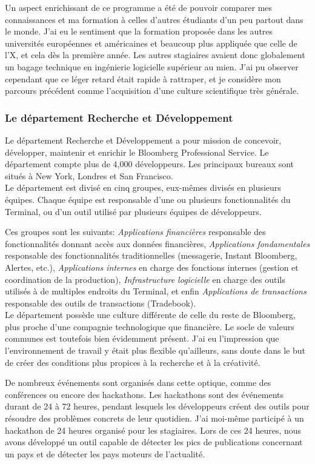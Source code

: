 \documentclass[11pt, oneside, titlepage, a4paper]{article}
\begin{document}
Un aspect enrichissant de ce programme a été de pouvoir comparer mes connaissances et ma formation à celles d'autres étudiants d'un peu partout dans le monde. J'ai eu le sentiment que la formation proposée dans les autres universités européennes et américaines et beaucoup plus \og appliquée \fg{} que celle de l'X, et cela dès la première année. Les autres stagiaires avaient donc globalement un bagage technique en ingénierie logicielle supérieur au mien. J'ai pu observer cependant que ce léger retard était rapide à rattraper, et je considère mon parcours précédent comme l'acquisition d'une culture scientifique très générale.
		\subsubsection{Le département Recherche et Développement} \label{RD}
Le département Recherche et Développement a pour mission de concevoir, développer, maintenir et enrichir le Bloomberg Professional Service. Le département compte plus de 4,000 développeurs. Les principaux bureaux sont situés à New York, Londres et San Francisco.
\\

Le département est divisé en cinq groupes, eux-mêmes divisés en plusieurs équipes. Chaque équipe est responsable d'une ou plusieurs fonctionnalités du Terminal, ou d'un outil utilisé par plusieurs équipes de développeurs.

Ces groupes sont les suivants: \textit{Applications financières} responsable des fonctionnalités donnant accès aux données financières, \textit{Applications fondamentales} responsable des fonctionnalités traditionnelles (messagerie, Instant Bloomberg, Alertes, etc.), \textit{Applications internes} en charge des fonctions internes (gestion et coordination de la production), \textit{Infrastructure logicielle} en charge des outils utilisés à de multiples endroits du Terminal, et enfin \textit{Applications de transactions} responsable des outils de transactions (Tradebook).
\\

Le département possède une culture différente de celle du reste de Bloomberg, plus proche d'une compagnie technologique que financière. Le socle de valeurs communes est toutefois bien évidemment présent. J'ai eu l'impression que l'environnement de travail y était plus flexible qu'ailleurs, sans doute dans le but de créer des conditions plus propices à la recherche et à la créativité.

De nombreux événements sont organisés dans cette optique, comme des conférences ou encore des hackathons. Les hackathons sont des événements durant de 24 à 72 heures, pendant lesquels les développeurs créent des outils pour résoudre des problèmes concrets de leur quotidien. J'ai moi-même participé à un hackathon de 24 heures organisé pour les stagiaires. Lors de ces 24 heures, nous avons développé un outil capable de détecter les pics de publications concernant un pays et de détecter les pays \og moteurs\fg{} de l'actualité.
\\
\end{document}
